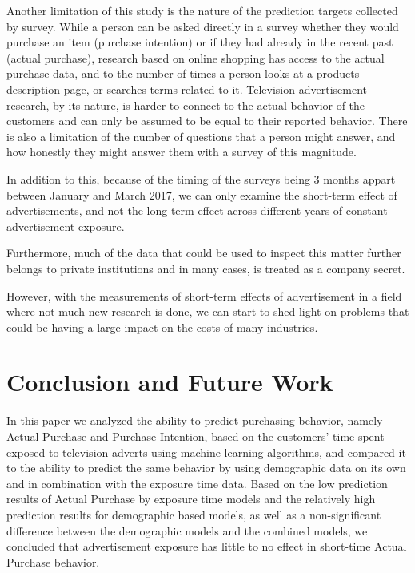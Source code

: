 \documentclass[review]{elsarticle}
\begin{document}
Another limitation of this study is the nature of the prediction targets collected by survey. While a person can be asked directly in a survey whether they would purchase an item (purchase intention) or if they had already in the recent past (actual purchase), research based on online shopping has access to the actual purchase data, and to the number of times a person looks at a products description page, or searches terms related to it. Television advertisement research, by its nature, is harder to connect to the actual behavior of the customers and can only be assumed to be equal to their reported behavior. There is also a limitation of the number of questions that a person might answer, and how honestly they might answer them with a survey of this magnitude.

In addition to this, because of the timing of the surveys being 3 months appart between January and March 2017, we can only examine the short-term effect of advertisements, and not the long-term effect across different years of constant advertisement exposure.

Furthermore, much of the data that could be used to inspect this matter further belongs to private institutions and in many cases, is treated as a company secret. 

However, with the measurements of short-term effects of advertisement in a field where not much new research is done, we can start to shed light on problems that could be having a large impact on the costs of many industries.

\section{Conclusion and Future Work}
\label{conclusion}

In this paper we analyzed the ability to predict purchasing behavior, namely Actual Purchase and Purchase Intention, based on the customers' time spent exposed to television adverts using machine learning algorithms, and compared it to the ability to predict the same behavior by using demographic data on its own and in combination with the exposure time data. Based on the low prediction results of Actual Purchase by exposure time models and the relatively high prediction results for demographic based models, as well as a non-significant difference between the demographic models and the combined models, we concluded that advertisement exposure has little to no effect in short-time Actual Purchase behavior. 
\end{document}
